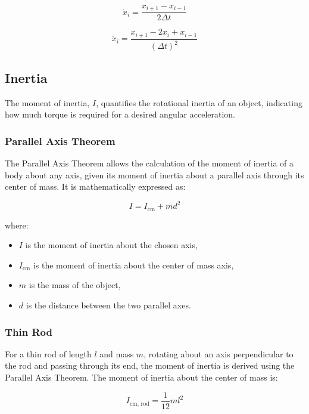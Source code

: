 \begin{equation}
\label{eq:first_derivative}
\dot{x}_i = \frac{x_{i+1} - x_{i-1}}{2\Delta t}
\end{equation}

\begin{equation}
\label{eq:second_derivative}
\ddot{x}_i = \frac{x_{i+1} - 2x_i + x_{i-1}}{(\Delta t)^2}
\end{equation}

\subsection{Inertia}
\label{sec:inertia}
The moment of inertia, \(I\), quantifies the rotational inertia of an object, indicating how much torque is required for a desired angular acceleration.

\subsubsection{Parallel Axis Theorem}
The Parallel Axis Theorem allows the calculation of the moment of inertia of a body about any axis, given its moment of inertia about a parallel axis through its center of mass. It is mathematically expressed as:

\begin{equation}
\label{eq:parallel_axis_theorem}
I = I_{\text{cm}} + md^2
\end{equation}

where:
\begin{itemize}
    \item \(I\) is the moment of inertia about the chosen axis,
    \item \(I_{\text{cm}}\) is the moment of inertia about the center of mass axis,
    \item \(m\) is the mass of the object,
    \item \(d\) is the distance between the two parallel axes.
\end{itemize}

\subsubsection{Thin Rod}
For a thin rod of length \(l\) and mass \(m\), rotating about an axis perpendicular to the rod and passing through its end, the moment of inertia is derived using the Parallel Axis Theorem. The moment of inertia about the center of mass is:

\begin{equation}
\label{eq:rod_cm_inertia}
I_{\text{cm, rod}} = \frac{1}{12}ml^2
\end{equation}

